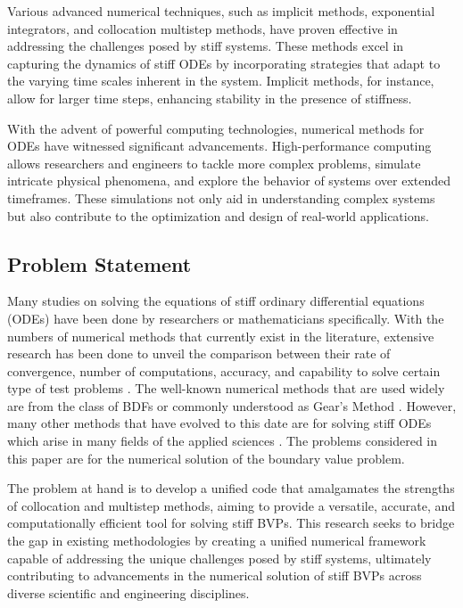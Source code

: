 \documentclass{report}
\begin{document}
Various advanced numerical techniques, such as implicit methods, exponential integrators, and collocation multistep methods, have proven effective in addressing the challenges posed by stiff systems. These methods excel in capturing the dynamics of stiff ODEs by incorporating strategies that adapt to the varying time scales inherent in the system. Implicit methods, for instance, allow for larger time steps, enhancing stability in the presence of stiffness.

With the advent of powerful computing technologies, numerical methods for ODEs have witnessed significant advancements. High-performance computing allows researchers and engineers to tackle more complex problems, simulate intricate physical phenomena, and explore the behavior of systems over extended timeframes. These simulations not only aid in understanding complex systems but also contribute to the optimization and design of real-world applications.

\subsection{Problem Statement}

Many studies on solving the equations of stiff ordinary differential equations (ODEs) have been done by researchers or mathematicians specifically. With the numbers of numerical methods that currently exist in the literature, extensive research has been done to unveil the comparison between their rate of convergence, number of computations, accuracy, and capability to solve certain type of test problems \cite{Enright1975} . The well-known numerical methods that are used widely are from the class of BDFs or commonly understood as Gear’s Method \cite{BYRNE1977125}. 
However, many other methods that have evolved to this date are for solving stiff ODEs which arise in many fields of the applied sciences \cite{Yatim2013}. The problems considered in this paper are for the numerical solution of the boundary value problem.

The problem at hand is to develop a unified code that amalgamates the strengths of collocation and multistep methods, aiming to provide a versatile, accurate, and computationally efficient tool for solving stiff BVPs. This research seeks to bridge the gap in existing methodologies by creating a unified numerical framework capable of addressing the unique challenges posed by stiff systems, ultimately contributing to advancements in the numerical solution of stiff BVPs across diverse scientific and engineering disciplines.
\end{document}
